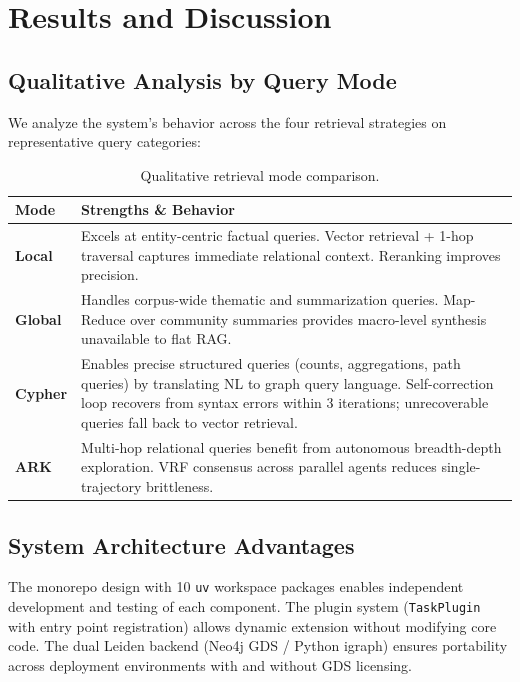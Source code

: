 \documentclass[11pt]{article}
\begin{document}
\section{Results and Discussion}

\subsection{Qualitative Analysis by Query Mode}

We analyze the system's behavior across the four retrieval strategies on representative query categories:

\begin{table}[t]
\centering
\small
\begin{tabularx}{\columnwidth}{l X}
\toprule
\textbf{Mode} & \textbf{Strengths \& Behavior} \\
\midrule
\textbf{Local} & Excels at entity-centric factual queries. Vector retrieval + 1-hop traversal captures immediate relational context. Reranking improves precision. \\
\textbf{Global} & Handles corpus-wide thematic and summarization queries. Map-Reduce over community summaries provides macro-level synthesis unavailable to flat RAG. \\
\textbf{Cypher} & Enables precise structured queries (counts, aggregations, path queries) by translating NL to graph query language. Self-correction loop recovers from syntax errors within 3 iterations; unrecoverable queries fall back to vector retrieval. \\
\textbf{ARK} & Multi-hop relational queries benefit from autonomous breadth-depth exploration. VRF consensus across parallel agents reduces single-trajectory brittleness. \\
\bottomrule
\end{tabularx}
\caption{Qualitative retrieval mode comparison.}
\label{tab:mode_comparison}
\end{table}

\subsection{System Architecture Advantages}

The monorepo design with 10 \texttt{uv} workspace packages enables independent development and testing of each component. The plugin system (\texttt{TaskPlugin} with entry point registration) allows dynamic extension without modifying core code. The dual Leiden backend (Neo4j GDS / Python igraph) ensures portability across deployment environments with and without GDS licensing.
\end{document}
